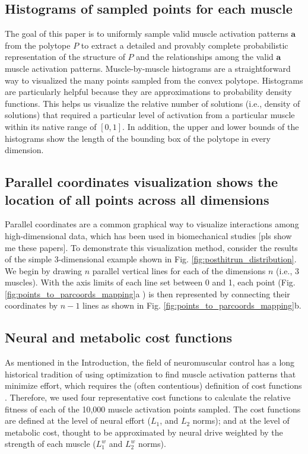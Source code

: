 \documentclass[10pt,letterpaper]{article}
\begin{document}
\subsection*{Histograms of sampled points for each muscle}
The goal of this paper is to uniformly sample valid  muscle activation patterns $\textbf{a}$ from the polytope $P$ to extract a detailed and provably complete probabilistic representation of the structure of $P$ and the relationships among the valid $\textbf{a}$ muscle activation patterns.  Muscle-by-muscle histograms are a straightforward way to visualized the many points sampled from the convex polytope.  Histograms are particularly helpful because they are approximations to probability density functions. This helps us visualize the relative number of solutions (i.e., density of solutions) that required a particular level of activation from a particular muscle within its native range of $[0,1]$. In addition, the upper and lower bounds of the histograms show the length of the bounding box of the polytope in every dimension.

\subsection*{Parallel coordinates visualization shows the location of all points across all dimensions}
Parallel coordinates are a common graphical way to visualize interactions among high-dimensional data, which has been used in biomechanical studies \cite{bachynskyi2013biomechanical, krekel2010visual} [pls show me these papers].
To demonstrate this visualization method, consider the results of the simple 3-dimensional example shown in Fig. \ref{fig:posthitrun_distribution}. We begin by drawing $n$ parallel vertical lines for each of the dimensions $n$ (i.e., 3 muscles).
With the axis limits of each line set between 0 and 1, each point (Fig. \ref{fig:points_to_parcoords_mapping}a ) is then represented by connecting their coordinates by $n-1$ lines as shown in Fig. \ref{fig:points_to_parcoords_mapping}b. 





\subsection*{Neural and metabolic cost functions}

As mentioned in the Introduction, the field of neuromuscular control has a long historical tradition of using optimization to find muscle activation patterns that minimize effort, which requires the (often contentious) definition of cost functions \cite{Prilutsky2000Muscle,crowninshield1981physiologically}. Therefore, we used four representative cost functions to calculate the relative fitness of each of the 10,000 muscle activation points sampled. The cost functions are defined at the level of neural effort ($L_1$, and $L_2$ norms); and at the level of metabolic cost, thought to be approximated by neural drive weighted by the strength of each muscle ($L_1^w$ and $L_2^w$ norms).
\end{document}
